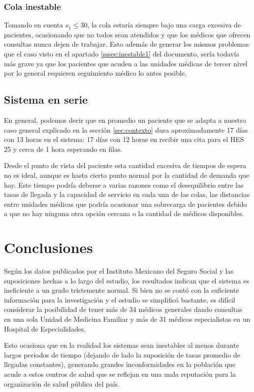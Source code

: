 \documentclass[10pt]{article}
\begin{document}
    \subsubsection{Cola inestable}
    Tomando en cuenta $s_{1} \leq 30$, la cola estaría siempre bajo una carga excesiva de pacientes, ocasionando que no todos sean atendidos y que los médicos que ofrecen consultas nunca dejen de trabajar. Esto además de generar los mismos problemas que el caso visto en el apartado \ref{sssec:inestable1} del documento, sería todavía más grave ya que los pacientes que acuden a las unidades médicas de tercer nivel por lo general requieren seguimiento médico lo antes posible.
    
    \newpage
    
    \subsection{Sistema en serie}
    En general, podemos decir que en promedio un paciente que se adapta a nuestro caso general explicado en la sección \ref{sec:contexto} dura aproximadamente 17 días con 13 horas en el sistema: 17 días con 12 horas en recibir una cita para el HES 25 y cerca de 1 hora esperando en filas.
    
    Desde el punto de vista del paciente esta cantidad excesiva de tiempos de espera no es ideal, aunque es hasta cierto punto normal por la cantidad de demanda que hay. Este tiempo podría deberse a varias razones como el desequilibrio entre las tasas de llegada y la capacidad de servicio en cada una de las colas, las distancias entre unidades médicas que podría ocasionar una sobrecarga de pacientes debido a que no hay ninguna otra opción cercana o la cantidad de médicos disponibles.
    
    \section{Conclusiones}
    Según los datos publicados por el Instituto Mexicano del Seguro Social y las suposiciones hechas a lo largo del estudio, los resultados indican que el sistema es ineficiente a un grado tristemente normal. Si bien no se contó con la suficiente información para la investigación y el estudio se simplificó bastante, es difícil considerar la posibilidad de tener más de 34 médicos generales dando consultas en una sola Unidad de Medicina Familiar y más de 31 médicos especialistas en un Hospital de Especialidades.
    
    Esto ocasiona que en la realidad los sistemas sean inestables al menos durante largos periodos de tiempo (dejando de lado la suposición de tasas promedio de llegadas constantes), generando grandes inconformidades en la población que acude a estos centros de salud que se reflejan en una mala reputación para la organización de salud pública del país.
    
\end{document}
